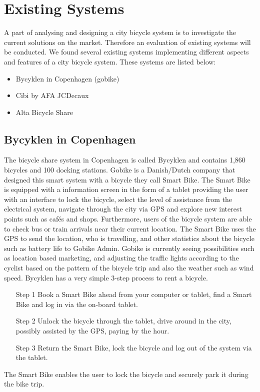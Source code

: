 \section{Existing Systems}
A part of analysing and designing a city bicycle system is to investigate the current solutions on the market. 
Therefore an evaluation of existing systems will be conducted.
We found several existing systems implementing different aspects and features of a city bicycle system. 
These systems are listed below:
\begin{itemize}
\item Bycyklen in Copenhagen (gobike)
\item Cibi by AFA JCDecaux
\item Alta Bicycle Share
\end{itemize}
\subsection{Bycyklen in Copenhagen}
The bicycle share system in Copenhagen is called Bycyklen and contains 1,860 bicycles and 100 docking stations. 
Gobike is a Danish/Dutch company that designed this smart system with a bicycle they call Smart Bike. 
The Smart Bike is equipped with a information screen in the form of a tablet providing the user with an interface to lock the bicycle, select the level of assistance from the electrical system, navigate through the city via GPS and explore new interest points such as cafés and shops.
Furthermore, users of the bicycle system are able to check bus or train arrivals near their current location.
The Smart Bike uses the GPS to send the location, who is travelling, and other statistics about the bicycle such as battery life to Gobike Admin.
Gobike is currently seeing possibilities such as location based marketing, and adjusting the traffic lights according to the cyclist based on the pattern of the bicycle trip and also the weather such as wind speed.
Bycyklen has a very simple 3-step process to rent a bicycle.
\begin{itemize}
\item[Step 1] Book a Smart Bike ahead from your computer or tablet, find a Smart Bike and log in via the on-board tablet.
\item[Step 2] Unlock the bicycle through the tablet, drive around in the city, possibly assisted by the GPS, paying by the hour.
\item[Step 3] Return the Smart Bike, lock the bicycle and log out of the system via the tablet.
\end{itemize}
The Smart Bike enables the user to lock the bicycle and securely park it during the bike trip.

